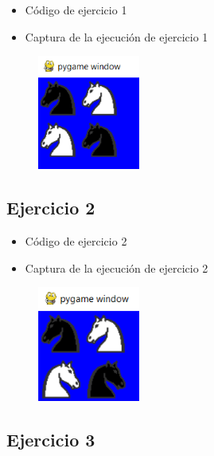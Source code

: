 \documentclass{article}
\begin{document}
	\begin{itemize}
		\item Código de ejercicio 1
	\end{itemize}
	
	\begin{itemize}
		\item Captura de la ejecución de ejercicio 1
	\end{itemize}
	\begin{figure}[H]
		\centering
		\includegraphics[width=0.3\textwidth,keepaspectratio]{imagenes/ejecucion1.png}
	\end{figure}
	\clearpage
	\subsection{Ejercicio 2}
	
	\begin{itemize}
		\item Código de ejercicio 2
	\end{itemize}
	
	\begin{itemize}
		\item Captura de la ejecución de ejercicio 2
	\end{itemize}
	\begin{figure}[H]
		\centering
		\includegraphics[width=0.3\textwidth,keepaspectratio]{imagenes/ejecucion2.png}
	\end{figure}
	\clearpage
	\subsection{Ejercicio 3}
	
\end{document}
